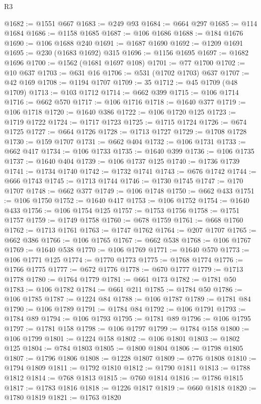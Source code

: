\begin{lexlean}{R3}
\begin{coremodule}
@1682 := @1551 @667
@1683 := @249 @93
@1684 := @664 @297
@1685 := @114 @1684
@1686 := @1158 @1685
@1687 := @106 @1686
@1688 := @184 @1676
@1690 := @106 @1688 @240
@1691 := @1687 @1690
@1692 := @1209 @1691
@1695 := @230 (@1683 @1692) @315
@1696 := @1156 @1695
@1697 := @1682 @1696
@1700 := @1562 (@1681 @1697 @108)
@1701 := @77 @1700
@1702 := @10 @637
@1703 := @631 @16
@1706 := @531 (@1702 @1703) @637
@1707 := @42 @169
@1708 := @1194 @1707
@1709 := 35
@1712 := @45 @1709 (@48 @1709)
@1713 := @103 @1712
@1714 := @662 @399
@1715 := @106 @1714
@1716 := @662 @570
@1717 := @106 @1716
@1718 := @1640 @377
@1719 := @106 @1718
@1720 := @1640 @386
@1722 := @106 @1720 @125
@1723 := @1719 @1722
@1724 := @1717 @1723
@1725 := @1715 @1724
@1726 := @674 @1725
@1727 := @664 @1726
@1728 := @1713 @1727
@1729 := @1708 @1728
@1730 := @159 @1707
@1731 := @662 @404
@1732 := @106 @1731
@1733 := @662 @417
@1734 := @106 @1733
@1735 := @1640 @399
@1736 := @106 @1735
@1737 := @1640 @404
@1739 := @106 @1737 @125
@1740 := @1736 @1739
@1741 := @1734 @1740
@1742 := @1732 @1741
@1743 := @676 @1742
@1744 := @666 @1743
@1745 := @1713 @1744
@1746 := @1730 @1745
@1747 := @170 @1707
@1748 := @662 @377
@1749 := @106 @1748
@1750 := @662 @433
@1751 := @106 @1750
@1752 := @1640 @417
@1753 := @106 @1752
@1754 := @1640 @433
@1756 := @106 @1754 @125
@1757 := @1753 @1756
@1758 := @1751 @1757
@1759 := @1749 @1758
@1760 := @678 @1759
@1761 := @668 @1760
@1762 := @1713 @1761
@1763 := @1747 @1762
@1764 := @207 @1707
@1765 := @662 @386
@1766 := @106 @1765
@1767 := @662 @538
@1768 := @106 @1767
@1769 := @1640 @538
@1770 := @106 @1769
@1771 := @1640 @570
@1773 := @106 @1771 @125
@1774 := @1770 @1773
@1775 := @1768 @1774
@1776 := @1766 @1775
@1777 := @672 @1776
@1778 := @670 @1777
@1779 := @1713 @1778
@1780 := @1764 @1779
@1781 := @661 @173
@1782 := @1781 @50
@1783 := @106 @1782
@1784 := @661 @211
@1785 := @1784 @50
@1786 := @106 @1785
@1787 := @1224 @84
@1788 := @106 @1787
@1789 := @1781 @84
@1790 := @106 @1789
@1791 := @1784 @84
@1792 := @106 @1791
@1793 := @1784 @89
@1794 := @106 @1793
@1795 := @1781 @89
@1796 := @106 @1795
@1797 := @1781 @158
@1798 := @106 @1797
@1799 := @1784 @158
@1800 := @106 @1799
@1801 := @1224 @158
@1802 := @106 @1801
@1803 := @1802 @125
@1804 := @784 @1803
@1805 := @1800 @1804
@1806 := @1798 @1805
@1807 := @1796 @1806
@1808 := @1228 @1807
@1809 := @776 @1808
@1810 := @1794 @1809
@1811 := @1792 @1810
@1812 := @1790 @1811
@1813 := @1788 @1812
@1814 := @768 @1813
@1815 := @760 @1814
@1816 := @1786 @1815
@1817 := @1783 @1816
@1818 := @1226 @1817
@1819 := @660 @1818
@1820 := @1780 @1819
@1821 := @1763 @1820

\end{coremodule}
\end{lexlean}
